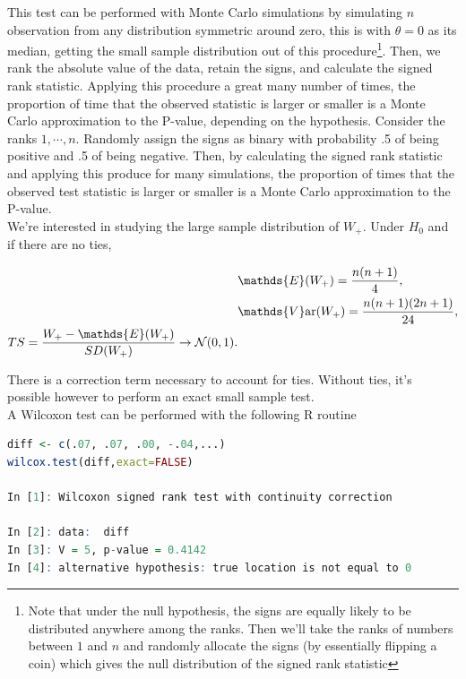 \documentclass{homework}
\begin{document}
This test can be performed with Monte Carlo simulations by simulating $n$ observation from any distribution symmetric around zero, this is with $\theta=0$ as its median, getting the small sample distribution out of this procedure\footnote{Note that under the null hypothesis, the signs are equally likely to be distributed anywhere among the ranks. Then we'll take the ranks of numbers between $1$ and $n$ and randomly allocate the signs (by essentially flipping a coin) which gives the null distribution of the signed rank statistic}.
Then, we rank the absolute value of the data, retain the signs, and calculate the signed rank statistic. Applying this procedure a great many number of times, the proportion of time that the observed statistic is larger or smaller is a Monte Carlo approximation to the P-value, depending on the hypothesis. Consider the ranks $1,\cdots,n$. Randomly assign the signs as binary with probability .5 of being positive and .5 of being negative. Then, by calculating the signed rank statistic and applying this produce for many simulations, the proportion of times that the observed test statistic is larger or smaller is a Monte Carlo approximation to the P-value.  \\

We're interested in studying the large sample distribution of $W_+$. Under $H_0$ and if there are no ties, 

\begin{align*}
    &\mathds{E}(W_+) = \frac{n(n+1)}{4}, \\
    &\mathds{V}\textnormal{ar}(W_+)=\frac{n(n+1)(2n+1)}{24}, \\
    TS = \frac{W_+-\mathds{E}(W_+)}{SD(W_+)} \rightarrow \mathcal{N}(0,1).
\end{align*}

There is a correction term necessary to account for ties. Without ties, it's possible however to perform an exact small sample test. \\

A Wilcoxon test can be performed with the following R routine
 
\begin{lstlisting}[language=R]
diff <- c(.07, .07, .00, -.04,...)
wilcox.test(diff,exact=FALSE)

In [1]: Wilcoxon signed rank test with continuity correction

In [2]: data:  diff
In [3]: V = 5, p-value = 0.4142
In [4]: alternative hypothesis: true location is not equal to 0
\end{lstlisting}
\end{document}
